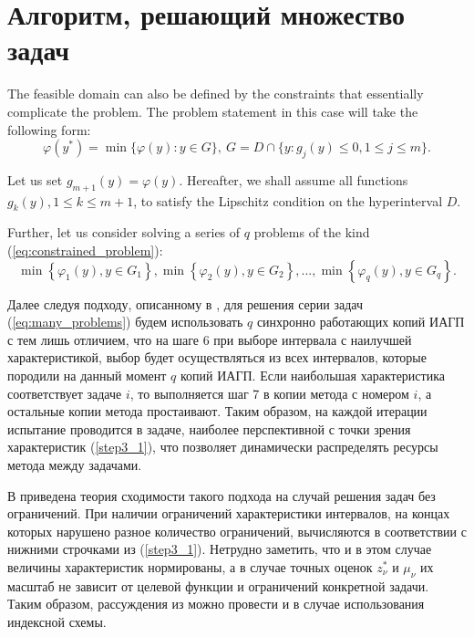 \section{Алгоритм, решающий множество задач}

The feasible domain can also be defined by the constraints that essentially complicate the problem.
The problem statement in this case will take the following form:
\begin{equation}
  \label{eq:constrained_problem}
  \varphi(y^*)=\min\{\varphi(y):y\in G\},\:G=D \cap \{y: g_j(y)\leqslant 0, 1\leqslant j\leqslant m\}.
\end{equation}

Let us set \(g_{m+1}(y)=\varphi(y)\). Hereafter, we shall assume all functions
\(g_k(y),1\leqslant k \leqslant m+1\),
to satisfy the Lipschitz condition on the hyperinterval \(D\).


Further, let us consider solving a series of \(q\) problems of the kind
(\ref{eq:constrained_problem}):
\begin{equation}
  \label{eq:many_problems}
  \min\left\{\varphi_1(y), y\in G_1 \right\}, \min\left\{\varphi_2(y), y\in G_2\right\},...,
\min\left\{\varphi_q(y), y\in G_q\right\}.
\end{equation}

Далее следуя подходу, описанному в \cite{BarkalovStrongin2018}, для решения серии задач (\ref{eq:many_problems}) будем
использовать \(q\) синхронно работающих копий ИАГП с тем лишь отличием, что на шаге 6 при выборе
интервала с наилучшей характеристикой, выбор будет осуществляться из всех интервалов, которые
породили на данный момент \(q\) копий ИАГП. Если наибольшая характеристика соответствует
задаче \(i\), то выполняется шаг 7 в копии метода с номером \(i\), а остальные копии метода простаивают.
Таким образом, на каждой итерации испытание проводится в задаче, наиболее перспективной с точки зрения
характеристик (\ref{step3_1}), что позволяет динамически распределять ресурсы метода между задачами.

В \cite{BarkalovStrongin2018} приведена теория сходимости такого подхода на случай решения задач без ограничений.
При наличии ограничений характеристики интервалов, на концах которых нарушено разное количество ограничений,
вычисляются в соответствии с нижними строчками из (\ref{step3_1}). Нетрудно заметить, что и в этом случае
величины характеристик нормированы, а в случае точных оценок \(z_{\nu }^{*}\) и \(\mu _{\nu }\) их
масштаб не зависит от целевой функции и ограничений конкретной задачи. Таким образом, рассуждения
из \cite{BarkalovStrongin2018} можно провести и в случае использования индексной схемы.

